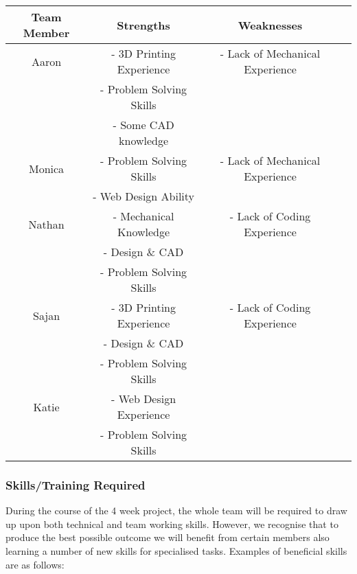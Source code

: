 \documentclass[12pt]{article}
\begin{document}
\begin{table}[!h]
\caption{}
\begin{center}
\begin{tabular}{|c|c|c|c|}
\hline
Team Member & Strengths & Weaknesses\\
 \hline
Aaron & - 3D Printing Experience & - Lack of Mechanical Experience\\
& - Problem Solving Skills & \\
& - Some CAD knowledge & \\
\hline
Monica & - Problem Solving Skills & - Lack of Mechanical Experience \\
& - Web Design Ability & \\
\hline
Nathan & - Mechanical Knowledge & - Lack of Coding Experience \\
& - Design \& CAD & \\
& - Problem Solving Skills &\\
\hline
Sajan & - 3D Printing Experience & - Lack of Coding Experience\\
& - Design \& CAD & \\
& - Problem Solving Skills &\\
\hline
Katie & - Web Design Experience & \\
& - Problem Solving Skills &\\
\hline
\end{tabular}
\end{center}
\label{default}
\end{table}

\subsubsection{Skills/Training Required}

During the course of the 4 week project, the whole team will be required to draw up upon both technical and team working skills. However, we recognise that to produce the best possible outcome we will benefit from certain members also learning a number of new skills for specialised tasks. Examples of beneficial skills are as follows:  
\end{document}
